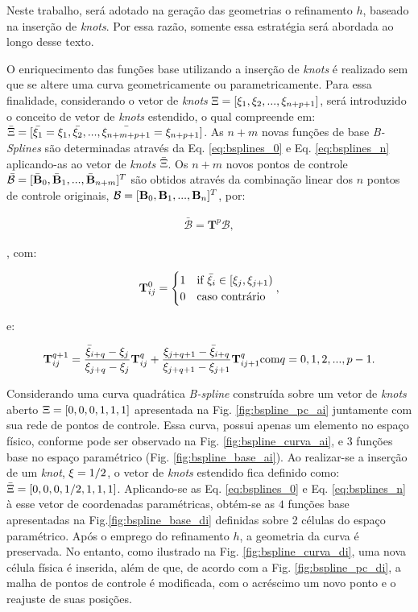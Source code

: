 \documentclass[tese_patricia]{subfiles}
\begin{document}
Neste trabalho, será adotado na geração das geometrias o refinamento $h$, baseado na inserção de \textit{knots}. Por essa razão, somente essa estratégia será abordada ao longo desse texto.

O enriquecimento das funções base utilizando a inserção de \textit{knots} é realizado sem que se altere uma curva geometricamente ou parametricamente. Para essa finalidade, considerando o vetor de \textit{knots} $\Xi = [\xi_1,\xi_2, ..., \xi_{n+p+1}]$, será introduzido o conceito de vetor de \textit{knots} estendido, o qual compreende em: $\bar{\Xi} = [\bar{\xi_1} = \xi_1,\bar{\xi_2}, ..., \bar{\xi_{n+m+p+1}}= \xi_{n+p+1}]$. As $n+m$ novas funções de base \textit{B-Splines} são determinadas através da Eq. \ref{eq:bsplines_0} e Eq. \ref{eq:bsplines_n} aplicando-as ao vetor de \textit{knots} $\bar{\Xi}$. Os $n+m$ novos pontos de controle  $\bar{\mathcal{B}} = [\bar{\mathbf{B}}_0,\bar{\mathbf{B}}_1,..., \bar{\mathbf{B}}_{n+m}]^{T}$ são obtidos através da combinação linear dos $n$ pontos de controle originais, $\mathcal{B} = [\mathbf{B}_0,\mathbf{B}_1,..., \mathbf{B}_{n}]^{T}$, por:


\begin{align}
	\bar{\mathcal{B}} = \mathbf{T}^{p}\mathcal{B},
\end{align}

\noindent, com:

\begin{align}
	\mathbf{T}_{ij}^{0} = \begin{cases} 1 &\mbox{if } \bar{\xi}_i \in \left[\xi_j,\xi_{j+1}\right) \\
		0 & \mbox{caso contrário } \end{cases}, 
\end{align}

\noindent e:

\begin{align}
	\mathbf{T}_{ij}^{q+1} = \frac{\bar{\xi}_{i+q}-\xi_j}{\xi_{j+q}-\xi_j}\mathbf{T}_{ij}^{q} + \frac{\xi_{j+q+1}-\bar{\xi}_{i+q}}{\xi_{j+q+1}-\xi_{j+1}}\mathbf{T}_{ij+1}^{q} \text{com} q=0,1,2,...,p-1.
\end{align}

Considerando uma curva quadrática \textit{B-spline} construída sobre um vetor de \textit{knots} aberto $\Xi=[0,0,0,1,1,1]$ apresentada na Fig. \ref{fig:bspline_pc_ai} juntamente com sua rede de pontos de controle. Essa curva, possui apenas um elemento no espaço físico, conforme pode ser observado na Fig. \ref{fig:bspline_curva_ai}, e $3$ funções base no espaço paramétrico (Fig. \ref{fig:bspline_base_ai}). Ao realizar-se a inserção de um \textit{knot}, $\xi=1/2$, o vetor de \textit{knots} estendido fica definido como: $\bar{\Xi}=[0,0,0,1/2,1,1,1]$. Aplicando-se as Eq. \ref{eq:bsplines_0} e Eq. \ref{eq:bsplines_n} à esse vetor de coordenadas paramétricas, obtém-se as $4$ funções base apresentadas na Fig.\ref{fig:bspline_base_di} definidas sobre 2 células do espaço paramétrico. Após o emprego do refinamento $h$, a geometria da curva é preservada. No entanto, como ilustrado na Fig. \ref{fig:bspline_curva_di}, uma nova célula física é inserida, além de que, de acordo com a Fig. \ref{fig:bspline_pc_di}, a malha de pontos de controle é modificada, com o acréscimo um novo ponto e o reajuste de suas posições.
\end{document}
